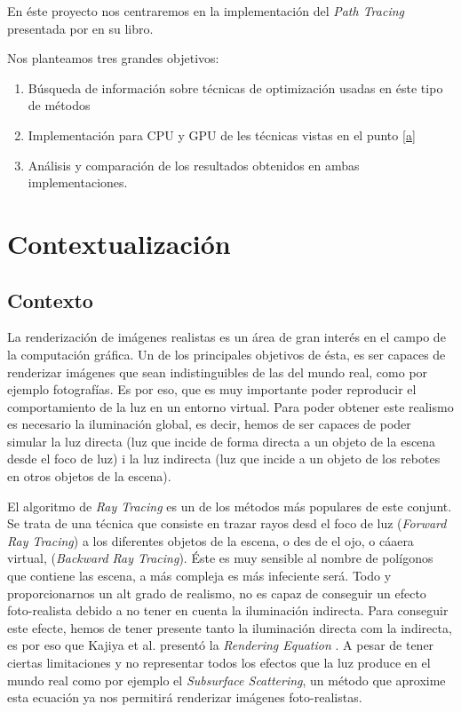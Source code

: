 \documentclass[twoside,a4paper,titlepage,11pt]{report}
\begin{document}
En éste proyecto nos centraremos en la implementación del \textit{Path Tracing} presentada por \cite{Shirley2018a} en su libro.

Nos planteamos tres grandes objetivos:

\begin{enumerate}
	\item \label{a} Búsqueda de información sobre técnicas de optimización usadas en éste tipo de métodos
	\item Implementación para CPU y GPU de les técnicas vistas en el punto \ref{a}
	\item Análisis y comparación de los resultados obtenidos en ambas implementaciones.
\end{enumerate}

\section{Contextualización}

\subsection{Contexto}

La renderización de imágenes realistas es un área de gran interés en el campo de la computación gráfica. Un de los principales objetivos de ésta, es ser capaces de renderizar imágenes que sean indistinguibles de las del mundo real, como por ejemplo fotografías. Es por eso, que es muy importante poder reproducir el comportamiento de la luz en un entorno virtual. Para poder obtener este realismo es necesario la iluminación global, es decir, hemos de ser capaces de poder simular la luz directa (luz que incide de forma directa a un objeto de la escena desde el foco de luz) i la luz indirecta (luz que incide a un objeto de los rebotes en otros objetos de la escena).

El algoritmo de \textit{Ray Tracing} es un de los métodos más populares de este conjunt. Se trata de una técnica que consiste en trazar rayos desd el foco de luz (\textit{Forward Ray Tracing}) a los diferentes objetos de la escena, o des de el ojo, o cáaera virtual, (\textit{Backward Ray Tracing}). Éste es muy sensible al nombre de polígonos que contiene las escena, a más compleja es más infeciente será. Todo y proporcionarnos un alt grado de realismo, no es capaz de conseguir un efecto foto-realista debido a no tener en cuenta la iluminación indirecta. Para conseguir este efecte, hemos de tener presente tanto la iluminación directa com la indirecta, es por eso que Kajiya et al. presentó la \textit{Rendering Equation} \cite{Kajiya1986}. A pesar de tener ciertas limitaciones y no representar todos los efectos que la luz produce en el mundo real como por ejemplo el \textit{Subsurface Scattering}, un método que aproxime esta ecuación ya nos permitirá renderizar imágenes foto-realistas.
\end{document}
